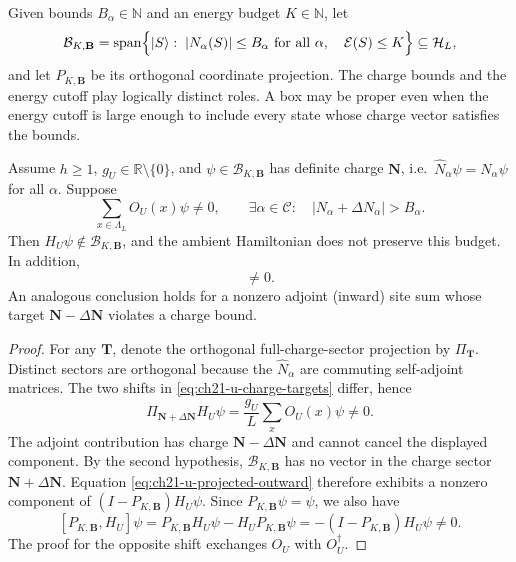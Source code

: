 \begin{definition}
\label{def:ch21-u-charge-box}
Given bounds \(B_\alpha\in\mathbb N\) and an energy budget
\(K\in\mathbb N\), let
\begin{equation}
 \mathcal B_{K,\mathbf B}
   =\operatorname{span}\Bigl\{|S\rangle:\;
       |N_\alpha(S)|\le B_\alpha\ \text{for all }\alpha,
       \quad\mathcal E(S)\le K\Bigr\}
       \subseteq\mathcal H_L,
 \label{eq:ch21-u-box}
\end{equation}
and let \(P_{K,\mathbf B}\) be its orthogonal coordinate projection.
The charge bounds and the energy cutoff play logically distinct roles.
A box may be proper even when the energy cutoff is large enough to
include every state whose charge vector satisfies the bounds.
\end{definition}

\begin{theorem}
\label{thm:ch21-u-leakage}
Assume \(h\ge1\), \(g_U\in\mathbb R\setminus\{0\}\), and
\(\psi\in\mathcal B_{K,\mathbf B}\) has definite charge
\(\mathbf N\), i.e.\ \(\widehat N_\alpha\psi=N_\alpha\psi\)
for all \(\alpha\).  Suppose
\begin{equation}
  \sum_{x\in\Lambda_L}O_U(x)\psi\ne0,
  \qquad
  \exists\alpha\in\mathcal C:\quad
      |N_\alpha+\Delta N_\alpha|>B_\alpha.
 \label{eq:ch21-u-leakage-hypotheses}
\end{equation}
Then \(H_U\psi\notin\mathcal B_{K,\mathbf B}\), and the ambient
Hamiltonian does not preserve this budget.  In addition,
\begin{equation}
 [P_{K,\mathbf B},H_U]\ne0.
 \label{eq:ch21-u-projector-noncommute}
\end{equation}
An analogous conclusion holds for a nonzero adjoint (inward) site sum
whose target \(\mathbf N-\Delta\mathbf N\) violates a charge bound.
\end{theorem}
\begin{proof}
For any \(\mathbf T\), denote the orthogonal full-charge-sector
projection by \(\Pi_{\mathbf T}\).  Distinct sectors are orthogonal
because the \(\widehat N_\alpha\) are commuting self-adjoint matrices.
The two shifts in \eqref{eq:ch21-u-charge-targets} differ, hence
\begin{equation}
 \Pi_{\mathbf N+\Delta\mathbf N}H_U\psi
   =\frac{g_U}{L}\sum_xO_U(x)\psi\ne0.
 \label{eq:ch21-u-projected-outward}
\end{equation}
The adjoint contribution has charge \(\mathbf N-\Delta\mathbf N\)
and cannot cancel the displayed component.  By the second hypothesis,
\(\mathcal B_{K,\mathbf B}\) has no vector in the charge sector
\(\mathbf N+\Delta\mathbf N\).  Equation
\eqref{eq:ch21-u-projected-outward} therefore exhibits a nonzero
component of \((I-P_{K,\mathbf B})H_U\psi\).
Since \(P_{K,\mathbf B}\psi=\psi\), we also have
\[
 [P_{K,\mathbf B},H_U]\psi
  =P_{K,\mathbf B}H_U\psi-H_UP_{K,\mathbf B}\psi
  =-(I-P_{K,\mathbf B})H_U\psi\ne0.
\]
The proof for the opposite shift exchanges \(O_U\) with \(O_U^\dagger\).
\end{proof}

